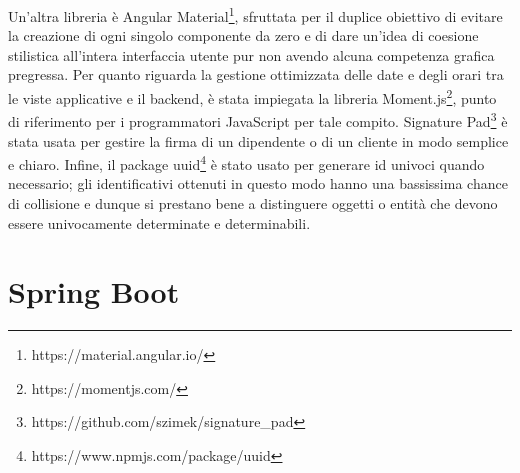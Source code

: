 Un'altra libreria è Angular Material\footnote{https://material.angular.io/}, sfruttata per il duplice obiettivo di evitare la creazione di ogni singolo componente da zero e di
dare un'idea di coesione stilistica all'intera interfaccia utente pur non avendo alcuna competenza grafica pregressa.
Per quanto riguarda la gestione ottimizzata delle date e degli orari tra le viste applicative e il backend, è stata impiegata la libreria Moment.js\footnote{https://momentjs.com/}, 
punto di riferimento per i programmatori JavaScript per tale compito.
Signature Pad\footnote{https://github.com/szimek/signature\_pad} è stata usata per gestire la firma di un dipendente o di un cliente in modo semplice e chiaro.
Infine, il package uuid\footnote{https://www.npmjs.com/package/uuid} è stato usato per generare id univoci quando necessario; gli identificativi ottenuti in questo modo hanno 
una bassissima chance di collisione e dunque si prestano bene a distinguere oggetti o entità che devono essere univocamente determinate e determinabili.

\section{Spring Boot}

